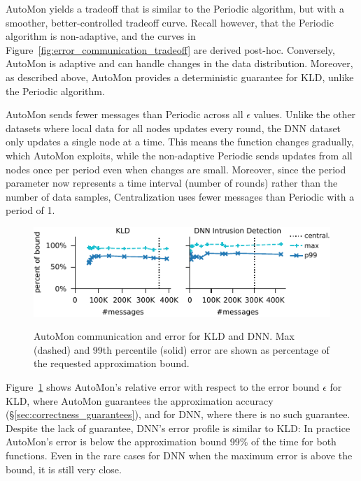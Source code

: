 AutoMon yields a tradeoff that is similar to the Periodic algorithm, but with a smoother, better-controlled tradeoff curve.
Recall however, that the Periodic algorithm is non-adaptive, and the curves in Figure~\ref{fig:error_communication_tradeoff} are derived post-hoc.
Conversely, AutoMon is adaptive and can handle changes in the data distribution.
Moreover, as described above, AutoMon provides a deterministic guarantee for KLD, unlike the Periodic algorithm.

AutoMon sends fewer messages than Periodic across all $\epsilon$ values.
Unlike the other datasets where local data for all nodes updates every round, the DNN dataset only updates a single node at a time.
This means the function changes gradually, which AutoMon exploits, while the non-adaptive Periodic sends updates from all nodes once per period even when changes are small.
Moreover, since the period parameter now represents a time interval (number of rounds) rather than the number of data samples, Centralization uses fewer messages than Periodic with a period of 1.

\begin{figure}
	\centering
	{\includegraphics[width=1.0\columnwidth]{figures/percent_error_kld_and_dnn.pdf}}
	\caption{
	    AutoMon communication and error for KLD and DNN.
	    Max (dashed) and 99th percentile (solid) error are shown as percentage of the requested approximation bound.
	    }

	\label{fig:percent_error_kld_and_dnn}
\end{figure}

Figure~\ref{fig:percent_error_kld_and_dnn} shows AutoMon's relative error with respect to the error bound $\epsilon$ for KLD, where AutoMon guarantees the approximation accuracy (\S\ref{sec:correctness_guarantees}), and for DNN, where there is no such guarantee.
Despite the lack of guarantee, DNN's error profile is similar to KLD:
In practice AutoMon's error is below the approximation bound 99\% of the time for both functions.
Even in the rare cases for DNN when the maximum error is above the bound, it is still very close.

